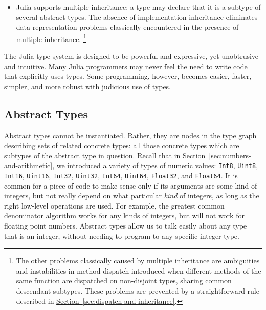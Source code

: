 \documentclass{article}
\renewcommand{\sec}[1]{\label{sec:#1}}
\newcommand{\Section}[1]{\hyperref[sec:#1]{Section~\ref*{sec:#1}}}
\begin{document}
\begin{itemize}
\item Julia supports multiple inheritance:
a type may declare that it is a subtype of several abstract types.
The absence of implementation inheritance eliminates data representation problems classically encountered in the presence of multiple inheritance.%
\footnote{The other problems classically caused by multiple inheritance are ambiguities and instabilities in method dispatch introduced when different methods of the same function are dispatched on non-disjoint types, sharing common descendant subtypes.
These problems are prevented by a straightforward rule described in \Section{dispatch-and-inheritance}.}

\end{itemize}
The Julia type system is designed to be powerful and expressive, yet unobtrusive and intuitive.
Many Julia programmers may never feel the need to write code that explicitly uses types.
Some programming, however, becomes easier, faster, simpler, and more robust with judicious use of types.

\subsection{Abstract Types}\sec{abstract-types}

Abstract types cannot be instantiated.
Rather, they are nodes in the type graph describing sets of related concrete types:
all those concrete types which are subtypes of the abstract type in question.
Recall that in \Section{numbers-and-arithmetic}, we introduced a variety of types of numeric values:
\verb|Int8|, \verb|Uint8|, \verb|Int16|, \verb|Uint16|, \verb|Int32|, \verb|Uint32|, \verb|Int64|, \verb|Uint64|, \verb|Float32|, and \verb|Float64|.
It is common for a piece of code to make sense only if its arguments are some kind of integers, but not really depend on what particular \emph{kind} of integers, as long as the right low-level operations are used.
For example, the greatest common denominator algorithm works for any kinds of integers, but will not work for floating point numbers.
Abstract types allow us to talk easily about any type that is an integer, without needing to program to any specific integer type.
\end{document}
